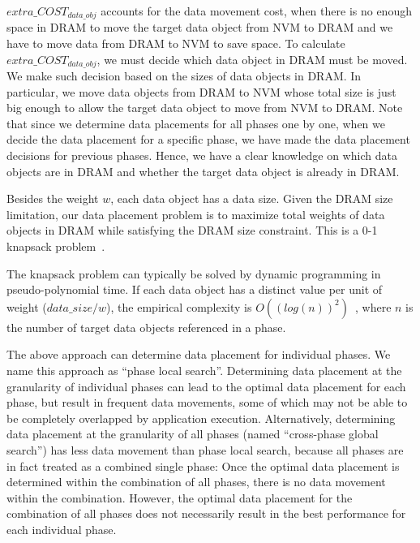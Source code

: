 $extra\_COST_{data\_obj}$ accounts for the data movement cost, 
when there is no enough space in DRAM to move the target data object
from NVM to DRAM and we have to move data from DRAM to NVM to save space.
To calculate $extra\_COST_{data\_obj}$, we must decide which data object in DRAM must be moved. We make such decision based on the sizes of data objects in DRAM. In particular, we move data objects from DRAM to NVM whose total size is just big enough to allow the target data object to move from NVM to DRAM. 
Note that since we determine data placements for all phases one by one,  when we decide the data placement for a specific phase, we have made the data placement decisions for previous phases. Hence, we have a clear knowledge on which data objects are in DRAM and whether the target data object is already in DRAM.


Besides the weight $w$, each data object has a data size.
Given the DRAM size limitation, our data placement problem
is to maximize total weights of data objects in DRAM while
satisfying the DRAM size constraint.
This is a 0-1 knapsack problem~\cite{knapsackbook}.

The knapsack problem can typically be solved by dynamic programming
in pseudo-polynomial time. If each data object has a distinct value per unit of weight ($data\_size/w$),
the empirical complexity is $O((log(n))^2)$~\cite{knapsackbook}, where $n$ is the number of target data objects referenced in a phase.

The above approach can determine data placement
for individual phases. We name this approach as ``phase local search''. Determining data placement at the granularity of individual phases can lead to the optimal data placement for each phase, but result in frequent data movements, some of which may not be able to be completely overlapped by application execution. Alternatively, determining data placement at the granularity of all phases (named ``cross-phase global search'') has less data movement than phase local search, because all phases are in fact treated as a combined single phase: Once the optimal data placement is determined within the combination of all phases, there is no data movement within the combination. However, the optimal data placement for the combination of all phases does not necessarily result in the best performance for each individual phase.

